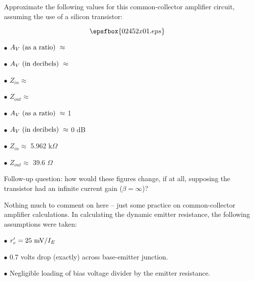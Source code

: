 

Approximate the following values for this common-collector amplifier circuit, assuming the use of a silicon transistor:

$$\epsfbox{02452x01.eps}$$

\medskip
\goodbreak
\item{$\bullet$} $A_V \hbox{ (as a ratio) } \approx$ 
\item{$\bullet$} $A_V \hbox{ (in decibels) } \approx$ 
\item{$\bullet$} $Z_{in} \approx$ 
\item{$\bullet$} $Z_{out} \approx$ 
\medskip







\medskip
\goodbreak
\item{$\bullet$} $A_V \hbox{ (as a ratio) } \approx$ 1
\item{$\bullet$} $A_V \hbox{ (in decibels) } \approx$ 0 dB
\item{$\bullet$} $Z_{in} \approx$ 5.962 k$\Omega$
\item{$\bullet$} $Z_{out} \approx$ 39.6 $\Omega$
\medskip

\vskip 10pt

Follow-up question: how would these figures change, if at all, supposing the transistor had an infinite current gain ($\beta = \infty$)?







Nothing much to comment on here -- just some practice on common-collector amplifier calculations.  In calculating the dynamic emitter resistance, the following assumptions were taken:

\medskip
\item{$\bullet$} $r'_e = 25 \hbox{ mV} / I_E$
\item{$\bullet$} 0.7 volts drop (exactly) across base-emitter junction.
\item{$\bullet$} Negligible loading of bias voltage divider by the emitter resistance.
\medskip

\goodbreak

